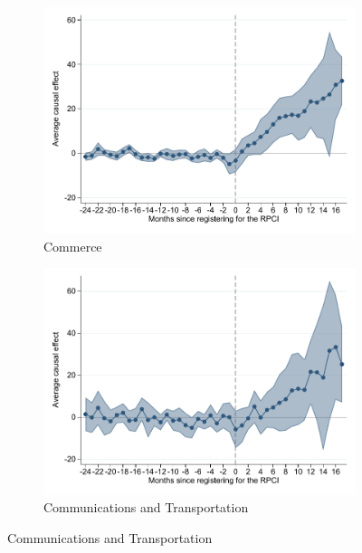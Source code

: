 \documentclass[oneside,11pt]{article}
\begin{document}
\begin{figure}[H]
\begin{center}
    \begin{subfigure}{0.49\textwidth}
    \caption{Commerce}
    \includegraphics[width=\textwidth]{04_Figures/muestra_10porciento/event_study_sal_cierre_chaisemartin_div_final_6.pdf}
    \end{subfigure}
    \begin{subfigure}{0.49\textwidth}
    \caption{Communications and Transportation}
    \includegraphics[width=\textwidth]{04_Figures/muestra_10porciento/event_study_sal_cierre_chaisemartin_div_final_7.pdf}
    \end{subfigure}
    
    \end{center}
\end{figure}
\end{document}

